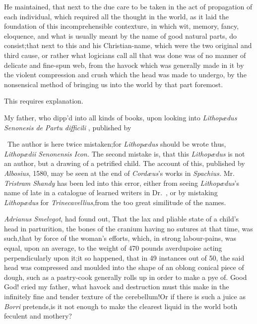 \documentclass{article}
\begin{document}
He maintained, that next to the due care to be taken in the act
of propagation of each individual, which required all the thought
in the world, as it laid the foundation of this incomprehensible
contexture, in which wit, memory, fancy, eloquence, and what is
usually meant by the name of good natural parts, do
consist;\tsk that next to this and his Christian-name, which were
the two original and
third cause, or rather what logicians
call 
all that was done was of no manner of 
delicate and fine-spun web, from the ha\-vock
which was generally made in it by
the violent compression and crush
which the head was made to undergo, by the nonsensical method of
bringing us into the world by that part foremost.

\tsh This requires explanation.

My father, who dipp’d into all kinds of books, upon looking into \textit{Lithopædus
Senonesis de Partu difficili} \fnast, published by\break
{}

\vfill

\bgroup\fontsize{8}{11}\selectfont\quad\fnast\ 
The author is here twice mistaken;\tsh for \textit{Lithopædus} should be wrote thus,
\textit{Lithopædii Seno\-nensis Icon.} The second mistake is, that this
\textit{Li\-thopædus} is not an author, but a drawing of a petrified child. The
account of this, published by \textit{Albosius}, 1580, may be seen at the end of
\textit{Cordæus}’s works in \textit{Spachius.} Mr.  \textit{Tristram Shandy} has
been led into this error, either from seeing \textit{Lithopædus}’s name of late in a
catalogue of learned writers in \hbox{Dr. \tsh}, or by mistaking \textit{Lithopædus}
for \textit{Trinecavellius},\tsk from the too great similitude of the names.\par\egroup

\newpage\noindent
\textit{Adrianus Smelvgot}, had found out, That\break
the lax and pliable state of a child’s\break
head in parturition, the bones of the\break
cranium having no sutures at that time,\break
was such,\tsk that by force of the woman’s\break
efforts, which, in strong labour-pains,\break
was equal, upon an average, to the
weight of 470 pounds averdupoise acting perpendicularly upon it;\tsk it so happened,
that in 49 instances out of 50, the said head was compressed and moulded into the
shape of an oblong conical piece of dough, such as a pastry-cook generally rolls up
in order to make a pye of.\tsh\break
Good God!  cried my father, what ha\-vock and destruction
must this make in the infinitely fine and tender texture of the cerebellum!\tsk Or if
there is such a juice as \textit{Borri} pretends,\tsk is it not enough to make the
clearest liquid in the world both feculent and
mothery?
\end{document}
